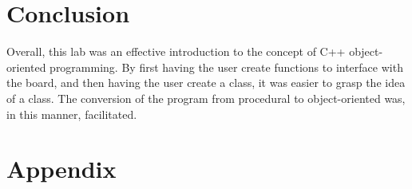 \documentclass[
	letterpaper, %
	10pt, %
]{CSUniSchoolLabReport}
\begin{document}
\section{Conclusion}

Overall, this lab was an effective introduction to the concept of C++ object-oriented programming. By first having the user create functions to interface with the board, and then having the user create a class, it was easier to grasp the idea of a class. The conversion of the program from procedural to object-oriented was, in this manner, facilitated.

\section{Appendix}


\end{document}
